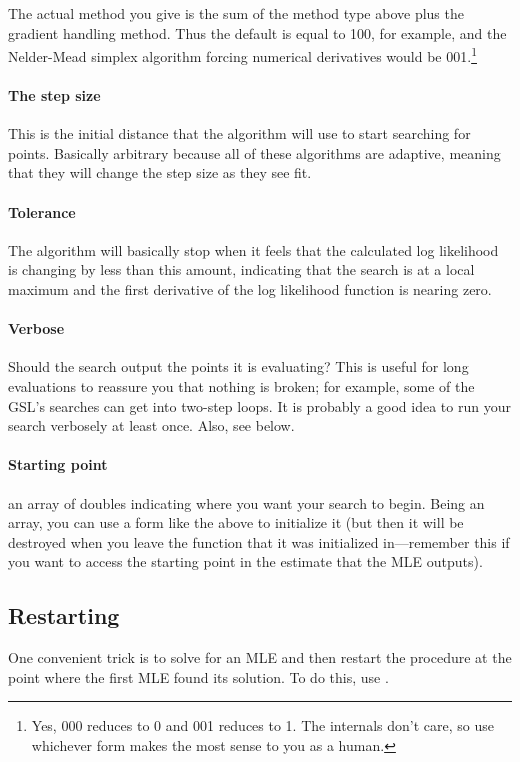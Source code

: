 The actual method you give is the sum of the method type above plus the
gradient handling method. Thus the default is equal to 100, for example, and the
Nelder-Mead simplex algorithm forcing numerical derivatives would be
001.\footnote{Yes, 000 reduces to 0 and 001 reduces to 1. The internals
don't care, so use whichever form makes the most sense to you as a human.}


\paragraph{The step size} This is the initial distance that the
algorithm will use to start searching for points. Basically arbitrary
because all of these algorithms are adaptive, meaning that they will
change the step size as they see fit.

\paragraph{Tolerance} The algorithm will basically stop when it feels
that the calculated log likelihood is changing by less than this amount,
indicating that the search is at a local maximum and the first derivative of
the log likelihood function is nearing zero.

\paragraph{Verbose} Should the search output the points it is evaluating?
This is useful for long evaluations to reassure you that nothing is
broken; for example, some of the GSL's searches can get into two-step loops.
It is probably a good idea to run your search verbosely at least once.
Also, see  below.

\paragraph{Starting point} an array of doubles indicating where you want
your search to begin. Being an array, you can use a form like the above
to initialize it (but then it will be destroyed when you leave the
function that it was initialized in---remember this if you want to
access the starting point in the estimate that the MLE outputs).


\subsection{Restarting} One convenient trick is to solve for an MLE and
then restart the procedure at the point where the first MLE found its solution.
To do this, use .

